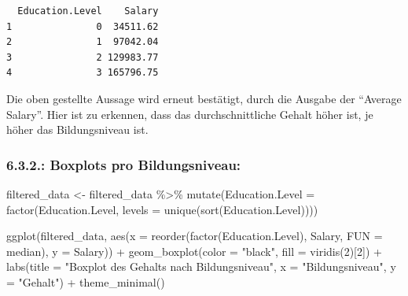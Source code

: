 \documentclass[
  letterpaper,
  DIV=11,
  numbers=noendperiod]{scrartcl}
\newenvironment{Shaded}{\begin{snugshade}}{\end{snugshade}}
\newcommand{\AttributeTok}[1]{\textcolor[rgb]{0.40,0.45,0.13}{#1}}
\newcommand{\DecValTok}[1]{\textcolor[rgb]{0.68,0.00,0.00}{#1}}
\newcommand{\FunctionTok}[1]{\textcolor[rgb]{0.28,0.35,0.67}{#1}}
\newcommand{\NormalTok}[1]{\textcolor[rgb]{0.00,0.23,0.31}{#1}}
\newcommand{\OtherTok}[1]{\textcolor[rgb]{0.00,0.23,0.31}{#1}}
\newcommand{\SpecialCharTok}[1]{\textcolor[rgb]{0.37,0.37,0.37}{#1}}
\newcommand{\StringTok}[1]{\textcolor[rgb]{0.13,0.47,0.30}{#1}}
\begin{document}
\begin{verbatim}
  Education.Level    Salary
1               0  34511.62
2               1  97042.04
3               2 129983.77
4               3 165796.75
\end{verbatim}

Die oben gestellte Aussage wird erneut bestätigt, durch die Ausgabe der
``Average Salary''. Hier ist zu erkennen, dass das durchschnittliche
Gehalt höher ist, je höher das Bildungsniveau ist.

\hypertarget{boxplots-pro-bildungsniveau}{%
\subsubsection{\texorpdfstring{6.3.2.: \textbf{Boxplots pro
Bildungsniveau:}}{6.3.2.: Boxplots pro Bildungsniveau:}}\label{boxplots-pro-bildungsniveau}}

\begin{Shaded}
\begin{Highlighting}[]
\NormalTok{filtered\_data }\OtherTok{\textless{}{-}}\NormalTok{ filtered\_data }\SpecialCharTok{\%\textgreater{}\%}
  \FunctionTok{mutate}\NormalTok{(}\AttributeTok{Education.Level =} \FunctionTok{factor}\NormalTok{(Education.Level, }\AttributeTok{levels =} \FunctionTok{unique}\NormalTok{(}\FunctionTok{sort}\NormalTok{(Education.Level))))}

\FunctionTok{ggplot}\NormalTok{(filtered\_data, }\FunctionTok{aes}\NormalTok{(}\AttributeTok{x =} \FunctionTok{reorder}\NormalTok{(}\FunctionTok{factor}\NormalTok{(Education.Level), Salary, }\AttributeTok{FUN =}\NormalTok{ median), }\AttributeTok{y =}\NormalTok{ Salary)) }\SpecialCharTok{+}
  \FunctionTok{geom\_boxplot}\NormalTok{(}\AttributeTok{color =} \StringTok{"black"}\NormalTok{, }\AttributeTok{fill =} \FunctionTok{viridis}\NormalTok{(}\DecValTok{2}\NormalTok{)[}\DecValTok{2}\NormalTok{]) }\SpecialCharTok{+}
  \FunctionTok{labs}\NormalTok{(}\AttributeTok{title =} \StringTok{"Boxplot des Gehalts nach Bildungsniveau"}\NormalTok{,}
       \AttributeTok{x =} \StringTok{"Bildungsniveau"}\NormalTok{,}
       \AttributeTok{y =} \StringTok{"Gehalt"}\NormalTok{) }\SpecialCharTok{+}
  \FunctionTok{theme\_minimal}\NormalTok{()}
\end{Highlighting}
\end{Shaded}
\end{document}
